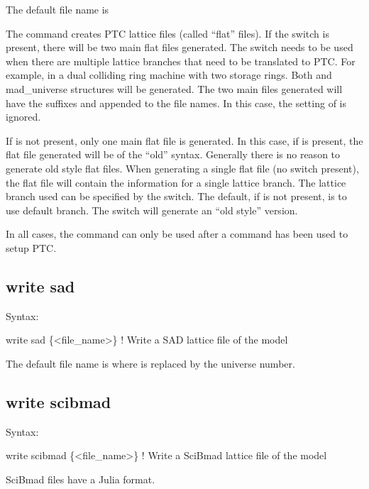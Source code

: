 {{{{{{{{{{{{The default file name is 

The  command creates PTC lattice files (called ``flat'' files).  If the 
switch is present, there will be two main flat files generated. The  switch needs to be
used when there are multiple lattice branches that need to be translated to PTC. For example, in a
dual colliding ring machine with two storage rings. Both  and  mad_universe
structures will be generated. The two main files generated will have the suffixes  and
 appended to the file names. In this case, the setting of  is ignored.

If  is not present, only one main flat file is generated. In this case, if  is
present, the flat file generated will be of the ``old'' syntax. Generally there is no reason to
generate old style flat files. When generating a single flat file (no  switch present), the
flat file will contain the information for a single lattice branch. The lattice branch used can be
specified by the  switch. The default, if  is not present, is to use default
branch. The  switch will generate an ``old style'' version.

In all cases, the  command can only be used after a  command has been
used to setup PTC.


\subsection{write sad}
\label{s:write.sad}

Syntax:
\begin{example}
  write sad \{<file_name>\}  ! Write a SAD lattice file of the model
\end{example}

The default file name is  where \vn{\#} is replaced by the universe number. 


\subsection{write scibmad}
\label{s:write.scibmad}

Syntax:
\begin{example}
  write scibmad \{<file_name>\}  ! Write a SciBmad lattice file of the model
\end{example}
SciBmad files have a Julia format.

}}}}}}}}}}}}
